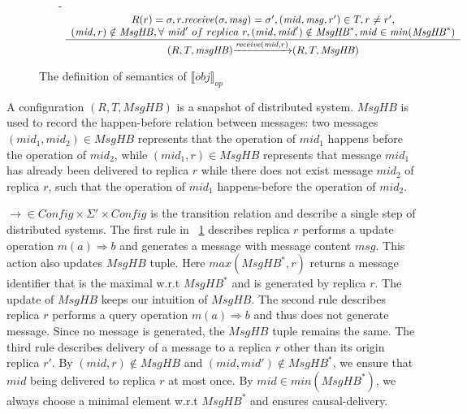 \begin{figure}[ht]
\begin{itemize}
\item[-] $\begin{array}{l c}
   \bigfrac{
   \begin{array}{c}
      R(r) = \sigma, r.\mathit{receive}(\sigma,\mathit{msg}) = \sigma', (\mathit{mid},\mathit{msg},r') \in T, r \neq r', \\
      (\mathit{mid},r) \notin \mathit{MsgHB}, \forall \ \mathit{mid}' \ of \ replica \ r, (\mathit{mid},\mathit{mid}') \notin \mathit{MsgHB}^*, \mathit{mid} \in \mathit{min}(\mathit{MsgHB}^*)
   \end{array}}
     {(R,T,\mathit{msgHB}) {\xrightarrow{\mathit{receive}(\mathit{mid},r)}} (R,T,\mathit{MsgHB} )}
\end{array}$
\end{itemize}
\caption{The definition of semantics of $\llbracket \mathit{obj} \rrbracket_{\mathit{op}}$}
\label{fig:the semantics of a operation-based CRDT object}
\end{figure}

A configuration $(R,T,\mathit{MsgHB})$ is a snapshot of distributed system. $\mathit{MsgHB}$ is used to record the happen-before relation between messages: two messages $(\mathit{mid}_1,\mathit{mid}_2) \in \mathit{MsgHB}$ represents that the operation of $\mathit{mid}_1$ happens before the operation of $\mathit{mid}_2$, while $(\mathit{mid}_1,r) \in \mathit{MsgHB}$ represents that message $\mathit{mid}_1$ has already been delivered to replica $r$ while there does not exist message $\mathit{mid}_2$ of replica $r$, such that the operation of $\mathit{mid}_1$ happens-before the operation of $\mathit{mid}_2$.

$\rightarrow \in \mathit{Config} \times \Sigma' \times \mathit{Config}$ is the transition relation and describe a single step of distributed systems. The first rule in \figurename~\ref{fig:the semantics of a operation-based CRDT object} describes replica $r$ performs a update operation $m(a) \Rightarrow b$ and generates a message with message content $\mathit{msg}$. This action also updates $\mathit{MsgHB}$ tuple. Here $\mathit{max}(\mathit{MsgHB}^*,r)$ returns a message identifier that is the maximal w.r.t $\mathit{MsgHB}^*$ and is generated by replica $r$. The update of $\mathit{MsgHB}$ keeps our intuition of $\mathit{MsgHB}$. The second rule describes replica $r$ performs a query operation $m(a) \Rightarrow b$ and thus does not generate message. Since no message is generated, the $\mathit{MsgHB}$ tuple remains the same. The third rule describes delivery of a message to a replica $r$ other than its origin replica $r'$. By $(\mathit{mid},r) \notin \mathit{MsgHB}$ and $(\mathit{mid},\mathit{mid}') \notin \mathit{MsgHB}^*$, we ensure that $\mathit{mid}$ being delivered to replica $r$ at most once. By $\mathit{mid} \in \mathit{min}(\mathit{MsgHB}^*)$, we always choose a minimal element w.r.t $\mathit{MsgHB}^*$ and ensures causal-delivery. 

